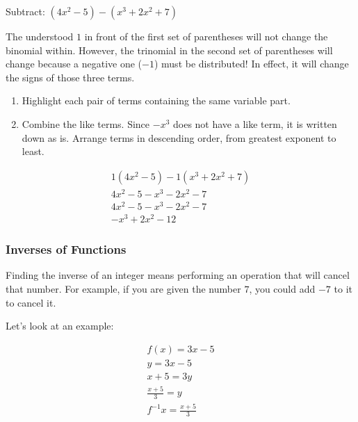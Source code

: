 \begin{example}
    Subtract: $(4x^2 - 5) - (x^3 + 2x^2 + 7)$
    
    The understood $1$ in front of the first set of parentheses will not change
    the binomial within. However, the trinomial in the second set of
    parentheses will change because a negative one ($-1$) must be distributed!
    In effect, it will change the signs of those three terms.

    \begin{enumerate}
        \item Highlight each pair of terms containing the same variable part.
        \item  Combine the like terms. Since $-x^3$ does not have a like term,
            it is written down as is. Arrange terms in descending order, from
            greatest exponent to least.
    \end{enumerate}

    \begin{align*}
        1(4x^2 - 5) - 1(x^3 + 2x^2 + 7) \\
        4x^2 - 5 - x^3 - 2x^2 - 7 \\
        4x^2 - 5 - x^3 - 2x^2 - 7 \\
        -x^3 + 2x^2 - 12
    \end{align*}
\end{example}

\subsubsection*{Inverses of Functions}

Finding the inverse of an integer means performing an operation that will
cancel that number. For example, if you are given the number $7$, you could add
$-7$ to it to cancel it.

Let's look at an example:

\begin{example}
    \begin{align*}
        f(x) = 3x - 5 \\
        y = 3x - 5 \\
        x + 5 = 3y \\
        \frac{x + 5}{3} = y \\
        f^{-1}x = \frac{x + 5}{3}
    \end{align*}
\end{example}

